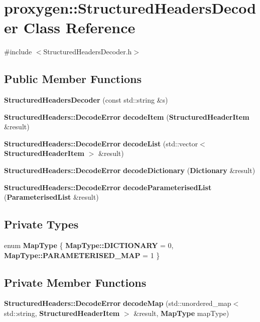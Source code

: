 \section{proxygen\+:\+:Structured\+Headers\+Decoder Class Reference}
\label{classproxygen_1_1StructuredHeadersDecoder}


{\ttfamily \#include $<$Structured\+Headers\+Decoder.\+h$>$}

\subsection*{Public Member Functions}
\begin{DoxyCompactItemize}
\item 
{\bf Structured\+Headers\+Decoder} (const std\+::string \&s)
\item 
{\bf Structured\+Headers\+::\+Decode\+Error} {\bf decode\+Item} ({\bf Structured\+Header\+Item} \&result)
\item 
{\bf Structured\+Headers\+::\+Decode\+Error} {\bf decode\+List} (std\+::vector$<$ {\bf Structured\+Header\+Item} $>$ \&result)
\item 
{\bf Structured\+Headers\+::\+Decode\+Error} {\bf decode\+Dictionary} ({\bf Dictionary} \&result)
\item 
{\bf Structured\+Headers\+::\+Decode\+Error} {\bf decode\+Parameterised\+List} ({\bf Parameterised\+List} \&result)
\end{DoxyCompactItemize}
\subsection*{Private Types}
\begin{DoxyCompactItemize}
\item 
enum {\bf Map\+Type} \{ {\bf Map\+Type\+::\+D\+I\+C\+T\+I\+O\+N\+A\+RY} = 0, 
{\bf Map\+Type\+::\+P\+A\+R\+A\+M\+E\+T\+E\+R\+I\+S\+E\+D\+\_\+\+M\+AP} = 1
 \}
\end{DoxyCompactItemize}
\subsection*{Private Member Functions}
\begin{DoxyCompactItemize}
\item 
{\bf Structured\+Headers\+::\+Decode\+Error} {\bf decode\+Map} (std\+::unordered\+\_\+map$<$ std\+::string, {\bf Structured\+Header\+Item} $>$ \&result, {\bf Map\+Type} map\+Type)
\end{DoxyCompactItemize}
